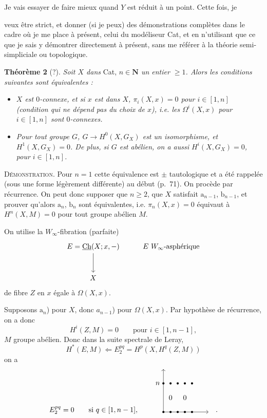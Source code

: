 \documentclass[11pt]{article}
\newcommand{\printedpage}[1]{{\reversemarginpar\marginnote{\raggedleft\scriptsize ed.~#1}}}
\newcommand{\msp}[1]{\marginpar{\raggedright\scriptsize ms.~#1}}
\newcommand{\Ch}{\underline{\mathrm{Ch}}}
\begin{document}
Je vais essayer de faire mieux quand $Y$ est réduit à un point. Cette fois, je

\printedpage{125}

\msp{page 188}
veux être strict, et donner (si je peux) des démonstrations complètes dans le cadre où je me place à présent, celui du modéliseur Cat, et en n'utilisant que ce que je sais y démontrer directement à présent, sans me référer à la théorie semi-simpliciale ou topologique.

\textbf{Théorème 2} (?). \textit{Soit $X$ dans} Cat, \textit{$n \in \mathbf{N}$ un entier $\geq 1$. Alors les conditions suivantes sont équivalentes :}

\begin{itemize}
\item[\textit{$a_n$)}] \textit{$X$ est $0$-connexe, et si $x$ est dans $X$, $\pi_i(X,x) = 0$ pour $i \in [1,n]$ (condition qui ne dépend pas du choix de $x$), i.e. les $\Omega^i(X,x)$ pour $i \in [1,n]$ sont $0$-connexes.}
\item[\textit{$b_n$)}] \textit{Pour tout groupe $G$, $G \longrightarrow H^0(X,G_X)$ est un isomorphisme, et $H^1(X,G_X) = 0$. De plus, si $G$ est abélien, on a aussi $H^i(X,G_X) = 0$, pour $i \in [1,n]$.}
\end{itemize}

\textsc{Démonstration}. Pour $n = 1$ cette équivalence est $\pm$ tautologique et a été rappelée (sous une forme légèrement différente) au début (p.~71). On procède par récurrence. On peut donc supposer que $n \geq 2$, que $X$ satisfait $\mathrm{a}_{n-1}$, $\mathrm{b}_{n-1}$, et prouver qu'alors $\mathrm{a}_n$, $\mathrm{b}_n$ sont équivalentes, i.e. $\pi_n(X,x) = 0$ équivaut à $H^n(X,M) = 0$ pour tout groupe abélien $M$.

\msp{page 189}
On utilise la $W_\infty$-fibration (parfaite)
\[
\begin{tikzcd}[row sep=large]
E = \Ch(X;x,-) \arrow[d] & E\ W_\infty\text{-asphérique} \\
X &
\end{tikzcd}
\]
de fibre $Z$ en $x$ égale à $\Omega(X,x)$.

Supposons $\mathrm{a}_n$) pour $X$, donc $a_{n-1}$) pour $\Omega(X,x)$. Par hypothèse de récurrence, on a donc
\[
H^i(Z,M) = 0 \qquad \text{pour } i \in [1,n-1],
\]
$M$ groupe abélien. Donc dans la suite spectrale de Leray,
\[
H^*(E,M) \Longleftarrow E_2^{pq} = H^p(X,H^q(Z,M))
\]
on a
\[
E_2^{pq} = 0 \qquad \text{si } q \in [1,n-1], \qquad
\begin{tikzpicture}[baseline=0]
\draw[->] (0,0) -- (2.2,0);
\draw[->] (0,0) -- (0,2.1);
\foreach \x in {0,0.35,0.7,1.05,1.4} {
  \fill (\x,0) circle (1.5pt);
  \fill (\x,1.4) circle (1.5pt);
}
\node[left] at (-0.05,1.4) {$n$};
\node at (0.35,0.7) {$0$};
\node at (1.05,0.7) {$0$};
\end{tikzpicture}
\quad .
\]
\end{document}
